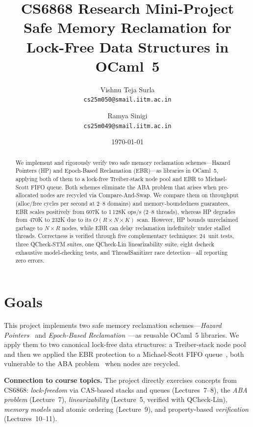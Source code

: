 \documentclass[11pt,a4paper]{article}
\title{%
  \textbf{CS6868 Research Mini-Project} \\[0.3em]
  \Large Safe Memory Reclamation for Lock-Free Data Structures in OCaml~5%
}
\author{%
  Vishnu Teja Surla \\ \texttt{cs25m050@smail.iitm.ac.in}
  \and
  Ramya Sinigi \\ \texttt{cs25m049@smail.iitm.ac.in}
}
\date{\today}
\begin{document}
\maketitle

\begin{abstract}
We implement and rigorously verify two safe memory reclamation schemes---Hazard
Pointers (HP) and Epoch-Based Reclamation (EBR)---as libraries in OCaml~5,
applying both of them to a lock-free Treiber-stack node pool and EBR to Michael-Scott FIFO
queue. Both schemes eliminate the ABA problem that arises when pre-allocated
nodes are recycled via Compare-And-Swap. We compare them on throughput
(alloc/free cycles per second at 2--8 domains) and memory-boundedness
guarantees. EBR scales positively from 607K to 1\,128K ops/s (2--8 threads),
whereas HP degrades from 470K to 232K due to its $O(R \times N \times K)$ scan.
However, HP bounds unreclaimed garbage to $N \times R$ nodes, while EBR can
delay reclamation indefinitely under stalled threads. Correctness is verified
through five complementary techniques: 24~unit tests, three QCheck-STM suites,
one QCheck-Lin linearizability suite, eight dscheck exhaustive model-checking
tests, and ThreadSanitizer race detection---all reporting zero errors.
\end{abstract}

\section{Goals}
\label{sec:goals}

This project implements two safe memory reclamation schemes---\emph{Hazard
Pointers}~\cite{michael2004hazard} and \emph{Epoch-Based
Reclamation}~\cite{fraser2004practical}---as reusable OCaml~5 libraries.
We apply them to two canonical lock-free data structures: a Treiber-stack
node pool~\cite{treiber1986systems} and then we applied the EBR protection to a 
Michael-Scott FIFO queue~\cite{michael1996simple}, both vulnerable to the ABA
problem~\cite[Ch.~10, \S10.6]{AoMPP} when nodes are recycled.

\medskip
\noindent\textbf{Connection to course topics.}
The project directly exercises concepts from CS6868:
\emph{lock-freedom} via CAS-based stacks and queues (Lectures~7--8),
the \emph{ABA problem} (Lecture~7),
\emph{linearizability} (Lecture~5, verified with QCheck-Lin),
\emph{memory models} and atomic ordering (Lecture~9), and
property-based \emph{verification} (Lectures~10--11).
\end{document}
